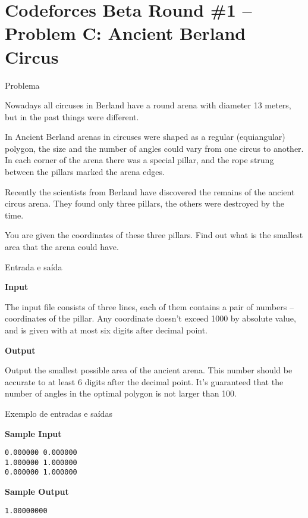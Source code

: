 \section{Codeforces Beta Round \#1 -- Problem C: Ancient Berland Circus}

\begin{frame}[fragile]{Problema}

Nowadays all circuses in Berland have a round arena with diameter 13 meters, but in the past things were different.

In Ancient Berland arenas in circuses were shaped as a regular (equiangular) polygon, the size and the number of angles could vary from one circus to another. In each corner of the arena there was a special pillar, and the rope strung between the pillars marked the arena edges.

Recently the scientists from Berland have discovered the remains of the ancient circus arena. They found only three pillars, the others were destroyed by the time.

You are given the coordinates of these three pillars. Find out what is the smallest area that the arena could have.

\end{frame}

\begin{frame}[fragile]{Entrada e saída}

\textbf{Input}

The input file consists of three lines, each of them contains a pair of numbers -- coordinates of the pillar. Any coordinate doesn't exceed 1000 by absolute value, and is given with at most six digits after decimal point.

\vspace{0.2in}

\textbf{Output}

Output the smallest possible area of the ancient arena. This number should be accurate to at least 6 digits after the decimal point. It's guaranteed that the number of angles in the optimal polygon is not larger than 100.

\end{frame}

\begin{frame}[fragile]{Exemplo de entradas e saídas}

\begin{minipage}[t]{0.5\textwidth}
\textbf{Sample Input}
\begin{verbatim}
0.000000 0.000000
1.000000 1.000000
0.000000 1.000000
\end{verbatim}
\end{minipage}
\begin{minipage}[t]{0.45\textwidth}
\textbf{Sample Output}
\begin{verbatim}
1.00000000
\end{verbatim}
\end{minipage}
\end{frame}

